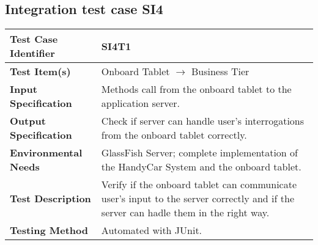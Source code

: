 \vspace{2em}

\subsection{Integration test case SI4}
\label{sec:performance-business}

\begin{tabular}{l p{}}
    \hline
    \textbf{Test Case Identifier} & SI4T1\\
    \hline
    \textbf{Test Item(s)} & Onboard Tablet $\rightarrow$ Business Tier\\
    \hline
    \textbf{Input Specification} & Methods call from the onboard tablet to the application server.\\
    \hline
    \textbf{Output Specification} & Check if server can handle user’s interrogations from the onboard tablet correctly.\\
    \hline
    \textbf{Environmental Needs} & GlassFish Server; complete implementation of the HandyCar System and the onboard tablet.\\
    \hline
    \textbf{Test Description} & Verify if the onboard tablet can communicate user’s input to the server correctly and if the server can hadle them in the right way.\\
    \hline
    \textbf{Testing Method} & Automated with JUnit.\\
    \hline
\end{tabular}